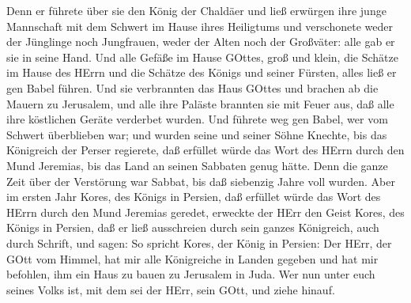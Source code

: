 Denn er führete über sie den König der Chaldäer und ließ erwürgen ihre
junge Mannschaft mit dem Schwert im Hause ihres Heiligtums und
verschonete weder der Jünglinge noch Jungfrauen, weder der Alten noch
der Großväter: alle gab er sie in seine Hand.  Und alle
Gefäße im Hause GOttes, groß und klein, die Schätze im Hause des HErrn
und die Schätze des Königs und seiner Fürsten, alles ließ er gen Babel
führen.  Und sie verbrannten das Haus GOttes und brachen ab
die Mauern zu Jerusalem, und alle ihre Paläste brannten sie mit Feuer
aus, daß alle ihre köstlichen Geräte verderbet wurden.  Und
führete weg gen Babel, wer vom Schwert überblieben war; und wurden seine
und seiner Söhne Knechte, bis das Königreich der Perser regierete,
 daß erfüllet würde das Wort des HErrn durch den Mund
Jeremias, bis das Land an seinen Sabbaten genug hätte. Denn die ganze
Zeit über der Verstörung war Sabbat, bis daß siebenzig Jahre voll
wurden.  Aber im ersten Jahr Kores, des Königs in Persien,
daß erfüllet würde das Wort des HErrn durch den Mund Jeremias geredet,
erweckte der HErr den Geist Kores, des Königs in Persien, daß er ließ
ausschreien durch sein ganzes Königreich, auch durch Schrift, und sagen:
 So spricht Kores, der König in Persien: Der HErr, der GOtt
vom Himmel, hat mir alle Königreiche in Landen gegeben und hat mir
befohlen, ihm ein Haus zu bauen zu Jerusalem in Juda. Wer nun unter euch
seines Volks ist, mit dem sei der HErr, sein GOtt, und ziehe hinauf.
